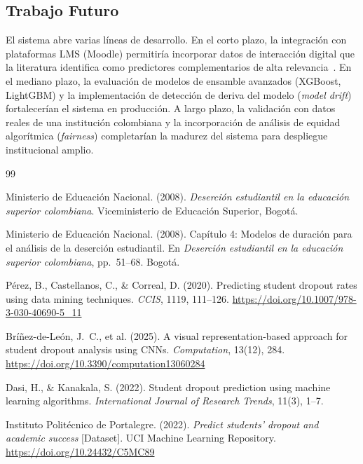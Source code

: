 \documentclass[12pt]{article}
\begin{document}
{\subsection{Trabajo Futuro}

El sistema abre varias líneas de desarrollo. En el corto plazo, la integración con
plataformas LMS (Moodle) permitiría incorporar datos de interacción digital que la
literatura identifica como predictores complementarios de alta relevancia~\cite{dasi2022}.
En el mediano plazo, la evaluación de modelos de ensamble avanzados (XGBoost, LightGBM)
y la implementación de detección de deriva del modelo (\textit{model drift}) fortalecerían
el sistema en producción. A largo plazo, la validación con datos reales de una institución
colombiana y la incorporación de análisis de equidad algorítmica (\textit{fairness})
completarían la madurez del sistema para despliegue institucional amplio.

\begin{thebibliography}{99}

Ministerio de Educación Nacional. (2008).
\textit{Deserción estudiantil en la educación superior colombiana}.
Viceministerio de Educación Superior, Bogotá.

Ministerio de Educación Nacional. (2008).
Capítulo 4: Modelos de duración para el análisis de la deserción estudiantil.
En \textit{Deserción estudiantil en la educación superior colombiana}, pp.~51--68. Bogotá.

Pérez, B., Castellanos, C., \& Correal, D. (2020).
Predicting student dropout rates using data mining techniques.
\textit{CCIS}, 1119, 111--126.
\url{https://doi.org/10.1007/978-3-030-40690-5_11}

Bríñez-de-León, J.~C., et al. (2025).
A visual representation-based approach for student dropout analysis using CNNs.
\textit{Computation}, 13(12), 284.
\url{https://doi.org/10.3390/computation13060284}

Dasi, H., \& Kanakala, S. (2022).
Student dropout prediction using machine learning algorithms.
\textit{International Journal of Research Trends}, 11(3), 1--7.

Instituto Politécnico de Portalegre. (2022).
\textit{Predict students' dropout and academic success} [Dataset].
UCI Machine Learning Repository.
\url{https://doi.org/10.24432/C5MC89}



\end{thebibliography}}
\end{document}
